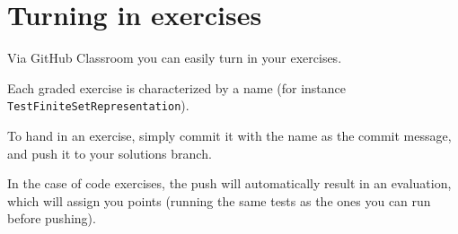 
\section{Turning in exercises}\label{sec:handin_instructions}

Via GitHub Classroom you can easily turn in your exercises.

Each graded exercise is characterized by a name (for instance \texttt{Test\-Finite\-Set\-Representation}).

To hand in an exercise, simply commit it with the name as the commit message, and push it to your solutions branch.

In the case of code exercises, the push will automatically result in an evaluation, which will assign you points (running the same tests as the ones you can run before pushing).
